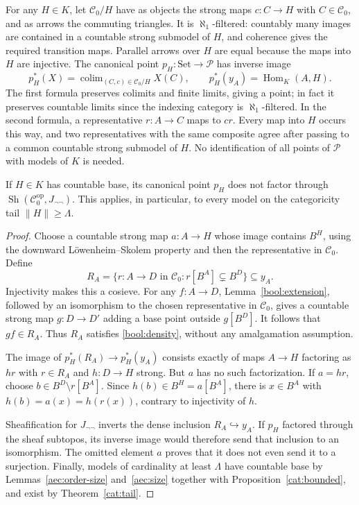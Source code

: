 For any \(H\in K\), let \(\mathcal C_0/H\) have as objects the
strong maps \(c:C\to H\) with \(C\in\mathcal C_0\), and as arrows
the commuting triangles. It is \(\aleph_1\)-filtered: countably many
images are contained in a countable strong submodel of \(H\), and
coherence gives the required transition maps. Parallel arrows over
\(H\) are equal because the maps into \(H\) are injective.
The canonical point \(p_H:\mathrm{Set}\to\mathcal P\) has inverse
image
\begin{equation}\label{bool:point}
 p_H^*(X)=\mathop{\mathrm{colim}}_{(C,c)\in\mathcal C_0/H}X(C),
 \qquad p_H^*(y_A)=\operatorname{Hom}_K(A,H).
\end{equation}
The first formula preserves colimits and finite limits, giving a
point; in fact it preserves countable limits since the indexing
category is \(\aleph_1\)-filtered. In the second formula, a
representative \(r:A\to C\) maps to \(cr\). Every map into \(H\)
occurs this way, and two representatives with the same composite
agree after passing to a common countable strong submodel of \(H\).
No identification of all points of \(\mathcal P\) with models of
\(K\) is needed.

\begin{proposition}\label{bool:obstruction}
If \(H\in K\) has countable base, its canonical point \(p_H\)
does not factor through
\(\operatorname{Sh}(\mathcal C_0^{\mathrm{op}},J_{\neg\neg})\).
This applies, in particular, to every model on the categoricity tail
\(\|H\|\ge\Lambda\).
\end{proposition}

\begin{proof}
Choose a countable strong map \(a:A\to H\) whose image contains
\(B^H\), using the downward L\"owenheim--Skolem property and then
the representative in \(\mathcal C_0\). Define
\[
 R_A=\{r:A\to D\text{ in }\mathcal C_0:
                 r[B^A]\subsetneq B^D\}\subseteq y_A.
\]
Injectivity makes this a cosieve. For any \(f:A\to D\),
Lemma~\ref{bool:extension}, followed by an isomorphism to the chosen
representative in \(\mathcal C_0\), gives a countable strong map
\(g:D\to D'\) adding a base point outside \(g[B^D]\).
It follows that \(gf\in R_A\). Thus \(R_A\) satisfies
\eqref{bool:density}, without any amalgamation assumption.

The image of \(p_H^*(R_A)\to p_H^*(y_A)\) consists exactly of
maps \(A\to H\) factoring as \(hr\) with \(r\in R_A\) and
\(h:D\to H\) strong. But \(a\) has no such factorization.
If \(a=hr\), choose \(b\in B^D\setminus r[B^A]\).
Since \(h(b)\in B^H=a[B^A]\), there is \(x\in B^A\) with
\(h(b)=a(x)=h(r(x))\), contrary to injectivity of \(h\).

Sheafification for \(J_{\neg\neg}\) inverts the dense inclusion
\(R_A\hookrightarrow y_A\). If \(p_H\) factored through the
sheaf subtopos, its inverse image would therefore send that inclusion
to an isomorphism. The omitted element \(a\) proves that it does
not even send it to a surjection. Finally, models of cardinality at
least \(\Lambda\) have countable base by
Lemmas~\ref{aec:order-size} and~\ref{aec:size} together with
Proposition~\ref{cat:bounded}, and exist by Theorem~\ref{cat:tail}.
\end{proof}

